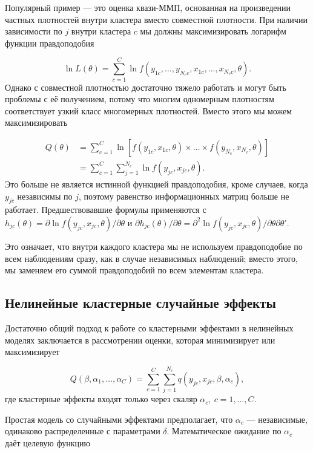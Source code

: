 Популярный пример --- это оценка квази-ММП, основанная на произведении частных плотностей внутри кластера вместо совместной плотности. При наличии зависимости по $j$ внутри кластера $c$ мы должны максимизировать логарифм функции правдоподобия

$$
\ln{L(\theta)} = \sum_{c=1}^{C} \ln{f (y_{1c}, \dots, y_{N_c c}, x_{1c}, \dots, x_{N_c c}, \theta)}.
$$ 
Однако с совместной плотностью достаточно тяжело работать и могут быть проблемы с её получением, потому что  многим одномерным плотностям  соответствует узкий класс  многомерных плотностей. Вместо этого мы можем максимизировать

\begin{align}
Q(\theta) & = \sum_{c=1}^C \ln [f(y_{1c}, x_{1c}, \theta) \times \dots \times f(y_{N_c}, x_{N_c}, \theta)] \nonumber\\
& = \sum_{c=1}^C \sum_{j=1}^{N_c} \ln{f(y_{jc}, x_{jc}, \theta)}. \nonumber
\end{align}
Это больше не является истинной функцией правдоподобия, кроме случаев, когда $y_{jc}$ независимы по $j$, поэтому равенство информационных матриц больше не работает. Предшествовавшие формулы применяются с $h_{jc}(\theta) = \partial \ln{f(y_{jc}, x_{jc}, \theta)} / \partial \theta$ и $\partial h_{jc}(\theta) / \partial \theta = \partial^2 \ln{f(y_{jc}, x_{jc}, \theta)} / \partial \theta \partial \theta'$. 

Это означает, что внутри каждого кластера мы не используем правдоподобие по всем наблюдениям сразу, как в случае независимых наблюдений; вместо этого, мы заменяем его суммой правдоподобий по всем элементам кластера. 

\subsection*{Нелинейные кластерные случайные эффекты}

Достаточно общий подход к работе со кластерными эффектами в нелинейных моделях заключается в рассмотрении оценки, которая минимизирует или максимизирует

\begin{equation}
\label{eq24.46}
Q(\beta, \alpha_1, \dots, \alpha_C) = \sum_{c=1}^C \sum_{j=1}^{N_c} q(y_{jc}, x_{jc}, \beta, \alpha_c),
\end{equation}
где кластерные эффекты входят только через скаляр $\alpha_c, \: c = 1, \dots, C$. 

Простая модель со случайными эффектами предполагает, что $\alpha_c$ --- независимые, одинаково распределенные с параметрами $\delta$. Математическое ожидание по $\alpha_c$ даёт целевую функцию

